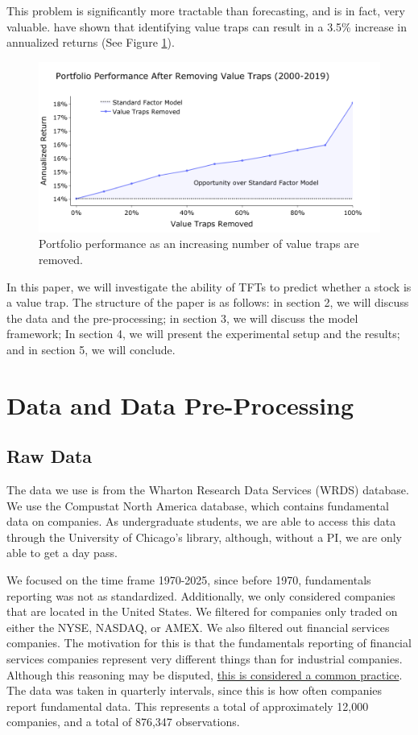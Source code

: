 \documentclass[AER]{AEA}
\begin{document}
This problem is significantly more tractable than forecasting, and is in fact, very valuable. \cite{euclidean}
have shown that identifying value traps can result in a 3.5\% increase in annualized returns (See Figure \ref{fig:clairvoyant}).

\begin{figure}[ht] 
    \includegraphics[scale = 0.3]{value_trap_clairvoyant_2.png}
    \caption{Portfolio performance as an increasing number of value traps are removed.}
    \label{fig:clairvoyant}
\end{figure}

In this paper, we will investigate the ability of TFTs to predict whether a stock is a value trap.
The structure of the paper is as follows: in section 2, we will discuss the data and the pre-processing; 
in section 3, we will discuss the model framework; In section 4, we will present the experimental setup
and the results; and in section 5, we will conclude.
\section{Data and Data Pre-Processing}
\subsection{Raw Data}
The data we use is from the Wharton Research Data Services (WRDS) database.
We use the Compustat North America database, which contains fundamental data on companies.
As undergraduate students, we are able to access this data through the University of Chicago's library,
although, without a PI, we are only able to get a day pass.

We focused on the time frame 1970-2025, since before 1970, fundamentals reporting was not as standardized.
Additionally, we only considered companies that are located in the United States. We filtered for companies
only traded on either the NYSE, NASDAQ, or AMEX. We also filtered out financial services companies. 
The motivation for this is that the fundamentals reporting of financial services companies represent
very different things than for industrial companies. Although this reasoning may be disputed, 
\href{https://alphaarchitect.com/why-exclude-financial-firms-from-quantitative-studies/}{this is considered
a common practice}. The data was taken in quarterly intervals, since this is how often companies report
fundamental data. This represents a total of approximately 12,000 companies, and a total of 876,347 observations.
\end{document}
